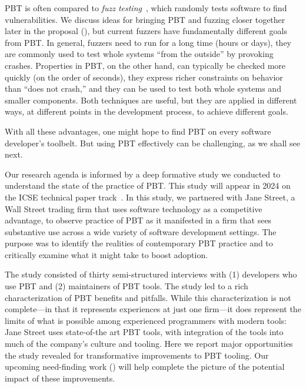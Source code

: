 PBT is often compared to {\em fuzz testing}~\cite{afl-readme},
which randomly tests software to find
vulnerabilities. We discuss ideas for bringing PBT and
fuzzing closer together later in the proposal
(), but current fuzzers have fundamentally
different goals from PBT.  In general, fuzzers need to run for a long time (hours or
days), they are commonly used to test whole systems ``from the
outside'' by provoking
crashes. Properties in PBT, on the other hand, can typically be
checked more quickly (on the order of seconds), they express richer
constraints on behavior than ``does not crash,'' and they can be used
to test both whole systems and smaller components.  Both techniques are useful, but
they are applied in different ways, at different points in the
development process, to achieve different goals.

With all these advantages, one might hope to find PBT on every
software developer's toolbelt.  But using PBT effectively
can be challenging, as we shall see next.

%
Our research agenda is informed by a deep formative study we conducted to
understand the state of the practice of PBT. This study will appear in 2024 on
the ICSE technical paper track~\cite{ref:goldstein2024property}.  In this
study, we partnered with Jane Street, a Wall Street trading firm that uses software
technology as a competitive advantage, to observe practice of PBT as it
manifested in a firm that sees substantive use across a wide variety of
software development settings.  The purpose was to identify the realities of
contemporary PBT practice and to critically examine what it might take to boost
adoption.

The study consisted of thirty semi-structured interviews with (1)
developers who use PBT and (2) maintainers of PBT tools. The study led to a
rich characterization of PBT benefits and pitfalls. While this characterization
is not complete---in that it represents experiences at just one firm---it does
represent the limits of what is possible among experienced programmers with
modern tools: Jane Street uses state-of-the art PBT tools, with integration of
the tools into much of the company's culture and tooling.  Here we report major opportunities the study revealed for transformative improvements to PBT tooling.  Our
upcoming need-finding work () will help complete the
picture of the potential impact of these improvements.

